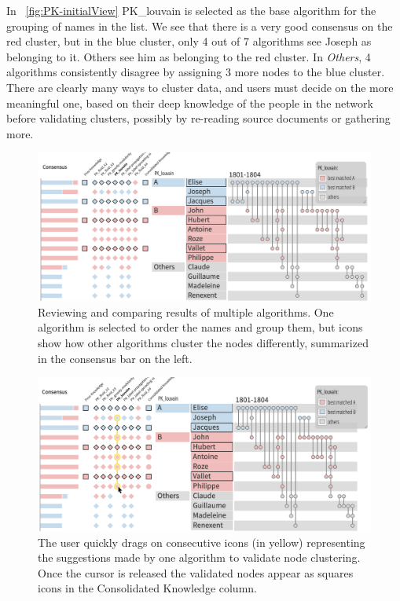 In ~\autoref{fig:PK-initialView} PK\_louvain is selected as the base algorithm for the grouping of names in the list. We see that there is a very good consensus on the red cluster, but in the blue cluster, only 4 out of 7 algorithms see Joseph as belonging to it.  Others see him as belonging to the red cluster. In \emph{Others}, 4 algorithms consistently disagree by assigning 3 more nodes to the blue cluster.
There are clearly many ways to cluster data, and users must decide on the more meaningful one, based on their deep knowledge of the people in the network before validating clusters, possibly by re-reading source documents or gathering more.

\begin{figure}
\centering
\includegraphics[width=\linewidth]{static/figures/PK-Clustering/VISPaperFigures/Small-initial.png}
\caption{Reviewing and comparing results of multiple algorithms. One algorithm is selected to order the names and group them, but icons show how other algorithms cluster the nodes differently, summarized in the consensus bar on the left.}
\label{fig:PK-initialView}
\end{figure}


\begin{figure}
\centering
\includegraphics[width=\linewidth]{static/figures/PK-Clustering/VISPaperFigures/Small-validating.png}
\caption{The user quickly drags on consecutive icons (in yellow) representing the suggestions made by one algorithm to validate node clustering. Once the cursor is released the validated nodes appear as squares icons in the Consolidated Knowledge column.}
\label{fig:PK-multipleValidation}
\end{figure}

